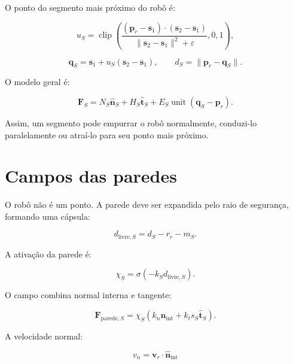 \documentclass[12pt,a4paper]{article}
\newcommand{\vect}[1]{\boldsymbol{#1}}
\newcommand{\unit}[1]{\widehat{\vect{#1}}}
\DeclareMathOperator{\clip}{clip}
\begin{document}
O ponto do segmento mais pr\'oximo do rob\^o \'e:

\begin{equation}
  u_S=\clip\left(
  \frac{(\vect{p}_r-\vect{s}_1)\cdot(\vect{s}_2-\vect{s}_1)}
  {\|\vect{s}_2-\vect{s}_1\|^2+\varepsilon},0,1\right),
\end{equation}

\begin{equation}
  \vect{q}_S=\vect{s}_1+u_S(\vect{s}_2-\vect{s}_1),\qquad
  d_S=\|\vect{p}_r-\vect{q}_S\|.
\end{equation}

O modelo geral \'e:

\begin{equation}
  \vect{F}_S=N_S\unit{n}_S+H_S\unit{t}_S+E_S\operatorname{unit}(\vect{q}_S-\vect{p}_r).
\end{equation}

Assim, um segmento pode empurrar o rob\^o normalmente, conduzi-lo paralelamente ou atra\'i-lo para seu ponto mais pr\'oximo.

\section{Campos das paredes}

O rob\^o n\~ao \'e um ponto. A parede deve ser expandida pelo raio de seguran\c{c}a, formando uma c\'apsula:

\begin{equation}
  d_{\mathrm{livre},S}=d_S-r_r-m_S.
\end{equation}

A ativa\c{c}\~ao da parede \'e:

\begin{equation}
  \chi_S=\sigma(-k_Sd_{\mathrm{livre},S}).
\end{equation}

O campo combina normal interna e tangente:

\begin{equation}
  \vect{F}_{\mathrm{parede},S}=\chi_S(k_n\unit{n}_{\mathrm{int}}+k_ts_S\unit{t}_S).
\end{equation}

A velocidade normal:

\begin{equation}
  v_n=\vect{v}_r\cdot\unit{n}_{\mathrm{int}}
\end{equation}
\end{document}
